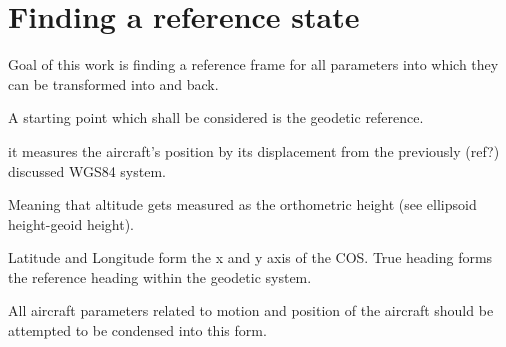 \section{Finding a reference state}
Goal of this work is finding a reference frame for all parameters into which they can be transformed into and back.

A starting point which shall be considered is the geodetic reference.

it measures the aircraft's position by its displacement from the previously (ref?) discussed WGS84 system.

Meaning that altitude gets measured as the orthometric height (see ellipsoid height-geoid height).

Latitude and Longitude form the x and y axis of the COS. True heading forms the reference heading within the geodetic system.

All aircraft parameters related to motion and position of the aircraft should be attempted to be condensed into this form.